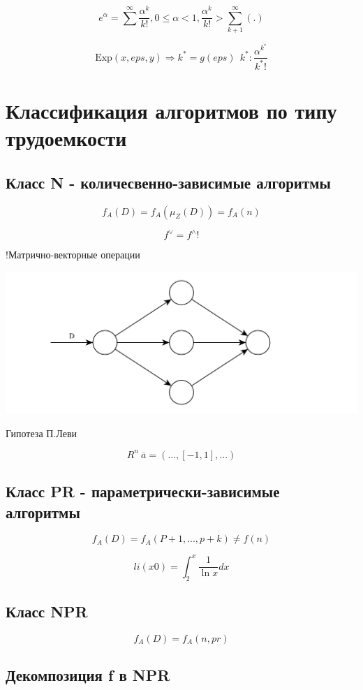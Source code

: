 \documentclass[a4paper, 14pt]{report}
\begin{document}
$$
e^\alpha = \sum^\infty \frac{\alpha^k}{k!}, 0 \le \alpha < 1,
\frac{\alpha^k}{k!} > \sum_{k+1}^\infty (.)
$$

$$
\text{Exp}(x,eps,y) \Rightarrow k^* = g(eps)\ \ k^* : \frac{\alpha^{k^*}}{k^*!}
$$

\chapter{Классификация алгоритмов по типу трудоемкости}

\section{Класс N - количесвенно-зависимые алгоритмы}

$$
f_A(D) = f_A(\mu_Z(D)) = f_A (n)
$$

$$
f^\vee = f^\wedge!
$$

!Матрично-векторные операции

\begin{center}
    \includegraphics[scale=0.5]{anal1}
\end{center}

Гипотеза П.Леви

$$
R^n\ \overline{a} = (..., [-1,1], ...)
$$

\section{Класс PR - параметрически-зависимые алгоритмы}

$$
f_A(D) = f_A(P+1,...,p+k) \ne f(n)
$$

$$
li(x0) = \int_2^x \frac{1}{\ln x} dx
$$

\section{Класс NPR}

$$
f_A(D) = f_A(n, pr)
$$

\section{Декомпозиция f в NPR}
\end{document}
